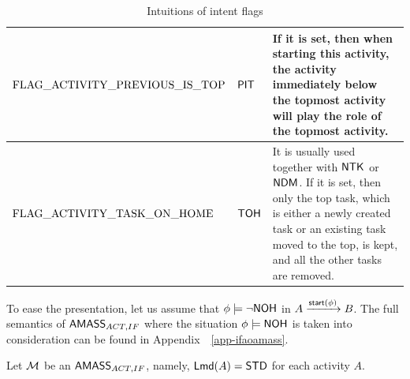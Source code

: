 \begin{table}[htbp]
\begin{center}
\begin{tabular}{|m{5.5cm}<{\centering}|m{2cm}<{\centering}|m{6cm}<{\centering}|}
    \hline
	$\rm  FLAG\_ACTIVITY\_PREVIOUS\_IS\_TOP$ & ${\sf PIT}$ & If it is set, then when starting this activity, the activity immediately below the topmost activity will play the role of the topmost activity.\\
    \hline
	$\rm FLAG\_ACTIVITY\_TASK\_ON\_HOME$ & ${\sf TOH}$ & It is usually used together with ${\sf NTK}$ or ${\sf NDM}$. If it is set, then only the top task, which is either a newly created task or an existing task moved to the top, is kept, and all the other tasks are removed. \\
    \hline
    \end{tabular}
\end{center}
    \caption{Intuitions of intent flags}
    \label{tab-int-flag}
\end{table}


To ease the presentation, let us assume that $\phi\models \neg {\sf NOH}$ in $A \xrightarrow{{\mathsf{start} }(\phi)} B$. The full semantics of $\textsf{AMASS}_{ACT,IF}$ where the situation $\phi \models {\sf NOH}$ is taken into consideration can be found in Appendix~~\ref{app-ifaoamass}.


Let ${\mathcal{M} }$ be an $\textsf{AMASS}_{ACT,IF}$, namely, ${\sf Lmd}(A) = {\sf STD}$ for each activity $A$.





